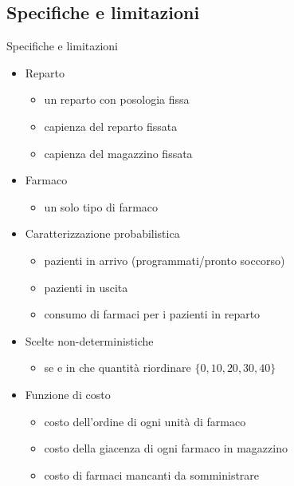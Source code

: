 \documentclass[9pt]{beamer}
\begin{document}
        \subsection{Specifiche e limitazioni}
            \begin{frame}{Specifiche e limitazioni}
              \begin{itemize}
                \item Reparto
                \begin{itemize}
                  \item un reparto con posologia fissa
                  \item capienza del reparto fissata
                  \item capienza del magazzino fissata
                \end{itemize}
                \item Farmaco
                \begin{itemize}
                  \item un solo tipo di farmaco
                \end{itemize}
                \item Caratterizzazione probabilistica
                \begin{itemize}
                  \item pazienti in arrivo (programmati/pronto soccorso)
                  \item pazienti in uscita
                  \item consumo di farmaci per i pazienti in reparto
                \end{itemize}
                \item Scelte non-deterministiche
                \begin{itemize}
                  \item se e in che quantità riordinare $\{0,10,20,30,40\}$
                \end{itemize}
                \item Funzione di costo
                \begin{itemize}
                  \item costo dell'ordine di ogni unità di farmaco
                  \item costo della giacenza di ogni farmaco in magazzino
                  \item costo di farmaci mancanti da somministrare
                \end{itemize}
              \end{itemize}
            \end{frame}
            
\end{document}
